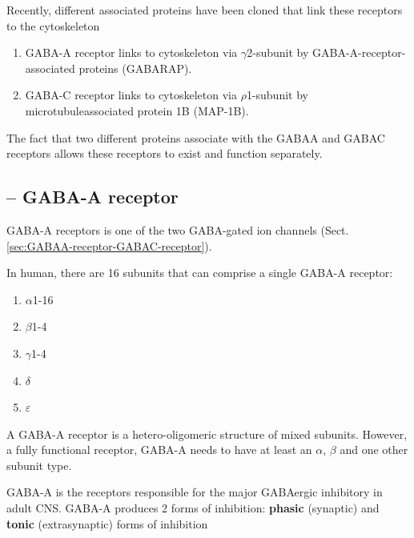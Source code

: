 Recently, different associated proteins have been cloned that link these
receptors to the cytoskeleton
\begin{enumerate}
  \item GABA-A receptor links to cytoskeleton via $\gamma$2-subunit by 
  GABA-A-receptor-associated proteins (GABARAP).
  
  \item GABA-C receptor links to cytoskeleton via $\rho$1-subunit by 
  microtubuleassociated protein 1B (MAP-1B).
\end{enumerate}
The fact that two different proteins associate with the GABAA
and GABAC receptors allows these receptors to
exist and function separately.



\subsection{-- GABA-A receptor}
\label{sec:GABAA-receptor}


GABA-A receptors is one of the two
GABA-gated ion channels (Sect.\ref{sec:GABAA-receptor-GABAC-receptor}). 

In human, there are 16 subunits that can comprise a single GABA-A receptor:
\begin{enumerate}
  \item $\alpha$1-16
  
  \item $\beta$1-4
  
  \item $\gamma$1-4
  
  \item $\delta$
  
  \item $\varepsilon$
\end{enumerate}

A GABA-A receptor is a hetero-oligomeric structure of mixed subunits.
However, a fully functional receptor, GABA-A needs to have at least an $\alpha$,
$\beta$ and one other subunit type.

GABA-A is the receptors responsible for the major GABAergic inhibitory
in adult CNS.  GABA-A produces 2 forms of inhibition: {\bf phasic} (synaptic)
and {\bf tonic} (extrasynaptic) forms of inhibition 

